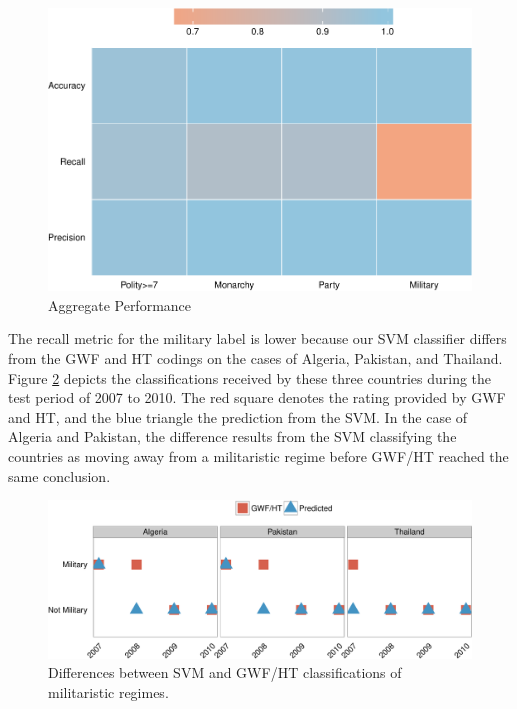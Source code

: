\documentclass[pdftex,12pt,fullpage,oneside]{amsart}
\begin{document}

\begin{figure}[ht]
	\centering
	\includegraphics[width=.7\textwidth]{allAggPerf}	
	\caption{Aggregate Performance}
	\label{fig:aggPerf}
\end{figure}
\FloatBarrier

The recall metric for the military label is lower because our SVM classifier differs from the GWF and HT codings on the cases of Algeria, Pakistan, and Thailand. Figure \ref{fig:milChng} depicts the classifications received by these three countries during the test period of 2007 to 2010. The red square denotes the rating provided by GWF and HT, and the blue triangle the prediction from the SVM. In the case of Algeria and Pakistan, the difference results from the SVM classifying the countries as moving away from a militaristic regime before GWF/HT reached the same conclusion. 

\begin{figure}[ht]
	\centering
	\includegraphics[width=.9\textwidth]{military_perfChange}
	\caption{Differences between SVM and GWF/HT classifications of militaristic regimes.}
	\label{fig:milChng}
\end{figure}
\FloatBarrier
\end{document}
